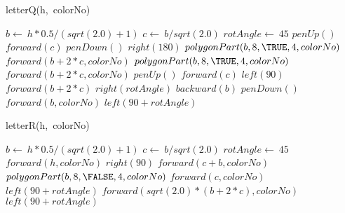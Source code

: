 \documentclass[a4paper,10pt]{article}
\begin{document}
\begin{algorithm}
\caption{letterQ(h,\ colorNo)}
\begin{algorithmic}[5]

\STATE {}
\STATE {}
  \STATE \(b\gets\ h*0.5/(sqrt(2.0)+1)\)
  \STATE \(c\gets\ b/sqrt(2.0)\)
  \STATE \(rotAngle\gets\ 45\)
  \STATE \(penUp()\)
  \STATE \(forward(c)\)
  \STATE \(penDown()\)
  \STATE \(right(180)\)
  \STATE {}
  \STATE {}
  \STATE \(polygonPart(b,8,\TRUE,4,colorNo)\)
  \STATE \(forward(b+2*c,colorNo)\)
  \STATE {}
  \STATE {}
  \STATE \(polygonPart(b,8,\TRUE,4,colorNo)\)
  \STATE \(forward(b+2*c,colorNo)\)
  \STATE \(penUp()\)
  \STATE \(forward(c)\)
  \STATE \(left(90)\)
  \STATE \(forward(b+2*c)\)
  \STATE \(right(rotAngle)\)
  \STATE \(backward(b)\)
  \STATE \(penDown()\)
  \STATE \(forward(b,colorNo)\)
  \STATE \(left(90+rotAngle)\)

\end{algorithmic}
\end{algorithm}


\begin{algorithm}
\caption{letterR(h,\ colorNo)}
\begin{algorithmic}[5]

\STATE {}
\STATE {}
  \STATE \(b\gets\ h*0.5/(sqrt(2.0)+1)\)
  \STATE \(c\gets\ b/sqrt(2.0)\)
  \STATE \(rotAngle\gets\ 45\)
  \STATE \(forward(h,colorNo)\)
  \STATE \(right(90)\)
  \STATE \(forward(c+b,colorNo)\)
  \STATE {}
  \STATE {}
  \STATE \(polygonPart(b,8,\FALSE,4,colorNo)\)
  \STATE \(forward(c,colorNo)\)
  \STATE \(left(90+rotAngle)\)
  \STATE \(forward(sqrt(2.0)*(b+2*c),colorNo)\)
  \STATE \(left(90+rotAngle)\)

\end{algorithmic}
\end{algorithm}
\end{document}
